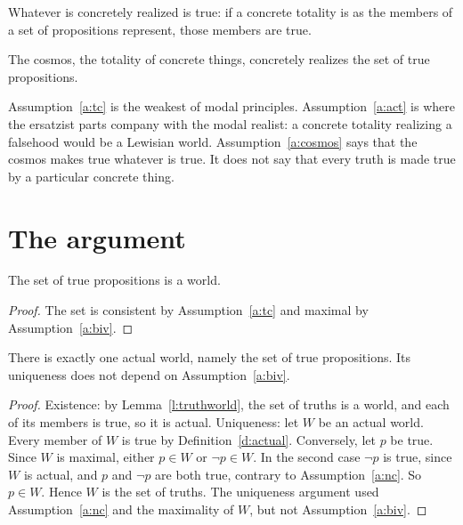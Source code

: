 \documentclass{situationist-preprint}
\begin{document}
\begin{assumption}\label{a:act}
Whatever is concretely realized is true: if a concrete totality is as the members of a set of propositions represent, those members are true.
\end{assumption}

\begin{assumption}\label{a:cosmos}
The cosmos, the totality of concrete things, concretely realizes the set of true propositions.
\end{assumption}

Assumption~\ref{a:tc} is the weakest of modal principles. Assumption~\ref{a:act} is where the ersatzist parts company with the modal realist: a concrete totality realizing a falsehood would be a Lewisian world. Assumption~\ref{a:cosmos} says that the cosmos makes true whatever is true. It does not say that every truth is made true by a particular concrete thing.

\section{The argument}

\begin{lemma}\label{l:truthworld}
The set of true propositions is a world.
\end{lemma}

\begin{proof}
The set is consistent by Assumption~\ref{a:tc} and maximal by Assumption~\ref{a:biv}.
\end{proof}

\begin{theorem}\label{t:actual}
There is exactly one actual world, namely the set of true propositions. Its uniqueness does not depend on Assumption~\ref{a:biv}.
\end{theorem}

\begin{proof}
Existence: by Lemma~\ref{l:truthworld}, the set of truths is a world, and each of its members is true, so it is actual. Uniqueness: let $W$ be an actual world. Every member of $W$ is true by Definition~\ref{d:actual}. Conversely, let $p$ be true. Since $W$ is maximal, either $p\in W$ or $\neg p\in W$. In the second case $\neg p$ is true, since $W$ is actual, and $p$ and $\neg p$ are both true, contrary to Assumption~\ref{a:nc}. So $p\in W$. Hence $W$ is the set of truths. The uniqueness argument used Assumption~\ref{a:nc} and the maximality of $W$, but not Assumption~\ref{a:biv}.
\end{proof}
\end{document}
